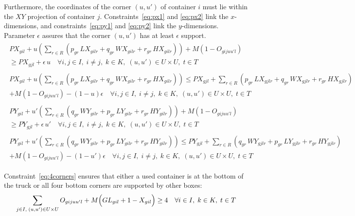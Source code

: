 Furthermore, the coordinates of the corner \((u,u')\) of container \(i\) must lie within the \(XY\) projection of container \(j\). Constraints~\eqref{eq:px1} and \eqref{eq:px2} link the \(x\)-dimensions, and constraints~\eqref{eq:py1} and \eqref{eq:py2} link the \(y\)-dimensions. Parameter \(\epsilon\) assures that the corner \((u,u')\) has at least \(\epsilon\) support.
\begin{gather}
  \begin{split}
    PX_{gil}+u\left(\sum_{r \in R}(p_{gr}\, LX_{gilr}+ q_{gr}\, WX_{gilr}+ r_{gr}\, HX_{gilr})\right) + M(1-O_{gijuu'l})\\
    \geq PX_{gjl} + \epsilon\, u \quad \forall i,j\in I,\; i\neq j,\; k\in K,\; (u,u')\in U\times U,\; t \in T \label{eq:px1}
  \end{split}\\[0.5em]
  \begin{split}
    PX_{gil}+u\left(\sum_{r \in R}(p_{gr}\, LX_{gilr}+ q_{gr}\, WX_{gilr}+ r_{gr}\, HX_{gilr})\right)
    \leq PX_{gjl}+\sum_{r \in R}(p_{gr}\, LX_{gjlr}+ q_{gr}\, WX_{gjlr}+ r_{gr}\, HX_{gjlr})\\
    + M(1-O_{gijuu'l}) - (1-u)\epsilon \quad \forall i,j\in I,\; i\neq j,\; k\in K,\; (u,u')\in U\times U,\; t \in T \label{eq:px2}
  \end{split}\\[0.5em]
  \begin{split}
    PY_{gil}+u'\left(\sum_{r \in R}(q_{gr}\, WY_{gilr}+ p_{gr}\, LY_{gilr}+ r_{gr}\, HY_{gilr})\right) + M(1-O_{gijuu'l})\\
    \geq PY_{gjl} + \epsilon\, u' \quad \forall i,j\in I,\; i\neq j,\; k\in K,\; (u,u')\in U\times U,\; t \in T \label{eq:py1}
  \end{split}\\[0.5em]
  \begin{split}
    PY_{gil}+u'\left(\sum_{r \in R}(q_{gr}\, WY_{gilr}+ p_{gr}\, LY_{gilr}+ r_{gr}\, HY_{gilr})\right)
    \leq PY_{gjl}+\sum_{r \in R}(q_{gr}\, WY_{gjlr}+ p_{gr}\, LY_{gjlr}+ r_{gr}\, HY_{gjlr})\\
    + M(1-O_{gijuu'l}) - (1-u')\epsilon \quad \forall i,j\in I,\; i\neq j,\; k\in K,\; (u,u')\in U\times U,\; t \in T \label{eq:py2}
  \end{split}
\end{gather}

Constraint~\eqref{eq:4corners} ensures that either a used container is at the bottom of the truck or all four bottom corners are supported by other boxes:
\begin{align}
  \sum_{j\in I,\; (u,u')\in U\times U} O_{gijuu'l} + M\Bigl(GL_{gil}+1-X_{gil}\Bigr) \geq 4 \quad \forall i\in I,\; k\in K,\; t \in T \label{eq:4corners}
\end{align}

